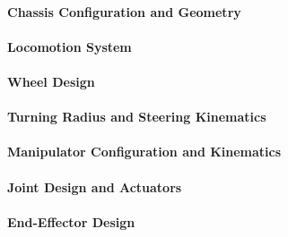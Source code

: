 \paragraph{Chassis Configuration and Geometry}
\label{par:chassis_configuration_geometry}


\paragraph{Locomotion System}
\label{par:locomotion_system}


\paragraph{Wheel Design}
\label{par:wheel_design}


\paragraph{Turning Radius and Steering Kinematics}
\label{par:turning_radius_steering_kinematics}


\paragraph{Manipulator Configuration and Kinematics}
\label{par:manipulator_configuration_kinematics}


\paragraph{Joint Design and Actuators}
\label{par:joint_design_actuators}


\paragraph{End-Effector Design}
\label{par:end_effector_design}


